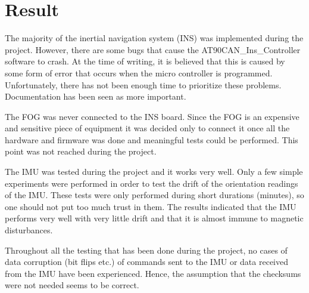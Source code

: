 
\section{Result}\label{sec:result}
The majority of the inertial navigation system (INS) was implemented during the project. However, there are some bugs that cause the AT90CAN\_Ins\_Controller software to crash. At the time of writing, it is believed that this is caused by some form of error that occurs when the micro controller is programmed. Unfortunately, there has not been enough time to prioritize these problems. Documentation has been seen as more important.

The FOG was never connected to the INS board. Since the FOG is an expensive and sensitive piece of equipment it was decided only to connect it once all the hardware and firmware was done and meaningful tests could be performed. This point was not reached during the project.

The IMU was tested during the project and it works very well. Only a few simple experiments were performed in order to test the drift of the orientation readings of the IMU. These tests were only performed during short durations (minutes), so one should not put too much trust in them. The results indicated that the IMU performs very well with very little drift and that it is almost immune to magnetic disturbances.

Throughout all the testing that has been done during the project, no cases of data corruption (bit flips etc.) of commands sent to the IMU or data received from the IMU have been experienced. Hence, the assumption that the checksums were not needed seems to be correct.
